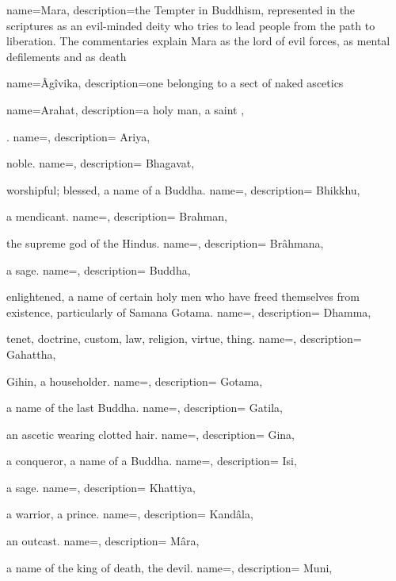 {
  name=Mara,
  description={the Tempter in Buddhism, represented in the scriptures as an evil-minded deity who tries to lead people from the path to liberation. The commentaries explain Mara as the lord of evil forces, as mental defilements and as death}
}

\newglossaryentry{}
{
  name=Âgîvika,
 description=one belonging to a sect of naked ascetics
}

\newglossaryentry{}
{
  name=Arahat,
 description=a holy man, a saint
}
,
	

.
\newglossaryentry{}
{
  name=,
 description=
}
Ariya,
	

noble.
\newglossaryentry{}
{
  name=,
 description=
}
Bhagavat,
	

worshipful; blessed, a name of a Buddha.
\newglossaryentry{}
{
  name=,
 description=
}
Bhikkhu,
	

a mendicant.
\newglossaryentry{}
{
  name=,
 description=
}
Brahman,
	

the supreme god of the Hindus.
\newglossaryentry{}
{
  name=,
 description=
}
Brâhmana,
	

a sage.
\newglossaryentry{}
{
  name=,
 description=
}
Buddha,
	

enlightened, a name of certain holy men who have freed themselves from existence, particularly of Samana Gotama.
\newglossaryentry{}
{
  name=,
 description=
}
Dhamma,
	

tenet, doctrine, custom, law, religion, virtue, thing.
\newglossaryentry{}
{
  name=,
 description=
}
Gahattha,
	

Gihin, a householder.
\newglossaryentry{}
{
  name=,
 description=
}
Gotama,
	

a name of the last Buddha.
\newglossaryentry{}
{
  name=,
 description=
}
Gatila,
	

an ascetic wearing clotted hair.
\newglossaryentry{}
{
  name=,
 description=
}
Gina,
	

a conqueror, a name of a Buddha.
\newglossaryentry{}
{
  name=,
 description=
}
Isi,
	

a sage.
\newglossaryentry{}
{
  name=,
 description=
}
Khattiya,
	

a warrior, a prince.
\newglossaryentry{}
{
  name=,
 description=
}
Kandâla,
	

an outcast.
\newglossaryentry{}
{
  name=,
 description=
}
Mâra,
	

a name of the king of death, the devil.
\newglossaryentry{}
{
  name=,
 description=
}
Muni,
	

